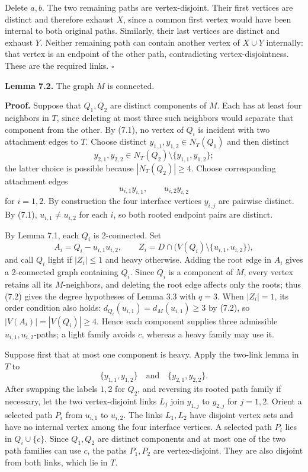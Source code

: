 \documentclass[
  11pt]{article}
\begin{document}
Delete \(a,b\). The two remaining paths are vertex-disjoint. Their first
vertices are distinct and therefore exhaust \(X\), since a common first
vertex would have been internal to both original paths. Similarly, their
last vertices are distinct and exhaust \(Y\). Neither remaining path can
contain another vertex of \(X\cup Y\) internally: that vertex is an
endpoint of the other path, contradicting vertex-disjointness. These are
the required links. \(\square\)

\textbf{Lemma 7.2.} The graph \(M\) is connected.

\textbf{Proof.} Suppose that \(Q_1,Q_2\) are distinct components of
\(M\). Each has at least four neighbors in \(T\), since deleting at most
three such neighbors would separate that component from the other. By
(7.1), no vertex of \(Q_i\) is incident with two attachment edges to
\(T\). Choose distinct \(y_{1,1},y_{1,2}\in N_T(Q_1)\) and then distinct
\[
 y_{2,1},y_{2,2}\in
 N_T(Q_2)\setminus\{y_{1,1},y_{1,2}\};
\] the latter choice is possible because \(|N_T(Q_2)|\ge4\). Choose
corresponding attachment edges \[
 u_{i,1}y_{i,1},
 \qquad
 u_{i,2}y_{i,2}
\] for \(i=1,2\). By construction the four interface vertices
\(y_{i,j}\) are pairwise distinct. By (7.1), \(u_{i,1}\ne u_{i,2}\) for
each \(i\), so both rooted endpoint pairs are distinct.

By Lemma 7.1, each \(Q_i\) is 2-connected. Set \[
 A_i=Q_i-u_{i,1}u_{i,2},
 \qquad
 Z_i=D\cap\bigl(V(Q_i)\setminus\{u_{i,1},u_{i,2}\}\bigr),
\] and call \(Q_i\) light if \(|Z_i|\le1\) and heavy otherwise. Adding
the root edge in \(A_i\) gives a 2-connected graph containing \(Q_i\).
Since \(Q_i\) is a component of \(M\), every vertex retains all its
\(M\)-neighbors, and deleting the root edge affects only the roots; thus
(7.2) gives the degree hypotheses of Lemma 3.3 with \(q=3\). When
\(|Z_i|=1\), its order condition also holds:
\(d_{Q_i}(u_{i,1})=d_M(u_{i,1})\ge3\) by (7.2), so
\(|V(A_i)|=|V(Q_i)|\ge4\). Hence each component supplies three
admissible \(u_{i,1},u_{i,2}\)-paths; a light family avoids \(c\),
whereas a heavy family may use it.

Suppose first that at most one component is heavy. Apply the two-link
lemma in \(T\) to \[
 \{y_{1,1},y_{1,2}\}
 \quad\text{and}\quad
 \{y_{2,1},y_{2,2}\}.
\] After swapping the labels \(1,2\) for \(Q_2\), and reversing its
rooted path family if necessary, let the two vertex-disjoint links
\(L_j\) join \(y_{1,j}\) to \(y_{2,j}\) for \(j=1,2\). Orient a selected
path \(P_i\) from \(u_{i,1}\) to \(u_{i,2}\). The links \(L_1,L_2\) have
disjoint vertex sets and have no internal vertex among the four
interface vertices. A selected path \(P_i\) lies in \(Q_i\cup\{c\}\).
Since \(Q_1,Q_2\) are distinct components and at most one of the two
path families can use \(c\), the paths \(P_1,P_2\) are vertex-disjoint.
They are also disjoint from both links, which lie in \(T\).
\end{document}
